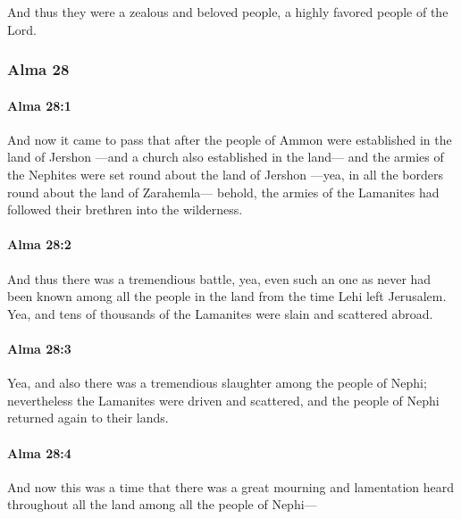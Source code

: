 			And thus they were a zealous and beloved people,
			a highly favored people of the Lord.

	\subsubsection{Alma 28} %
		\label{ALMA-28}
		
		\paragraph{Alma 28:1} %
			\label{ALMA-28-1}

			And now it came to pass that
			after the people of Ammon were established in the land of Jershon
			---and a church also established in the land---
			and the armies of the Nephites were set round about the land of Jershon
			---yea, in all the borders round about the land of Zarahemla---
			behold, the armies of the Lamanites had followed their brethren into the wilderness.

		\paragraph{Alma 28:2} %
			\label{ALMA-28-2}

			And thus there was a tremendious battle,
			yea, even such an one as never had been known among all the people in the land
			from the time Lehi left Jerusalem.
			Yea, and tens of thousands of the Lamanites were slain and scattered abroad.

		\paragraph{Alma 28:3} %
			\label{ALMA-28-3}

			Yea, and also there was a tremendious slaughter among the people of Nephi;
			nevertheless the Lamanites were driven and scattered,
			and the people of Nephi returned again to their lands.

		\paragraph{Alma 28:4} %
			\label{ALMA-28-4}

			And now this was a time that there was a great mourning and lamentation
			heard throughout all the land among all the people of Nephi---

